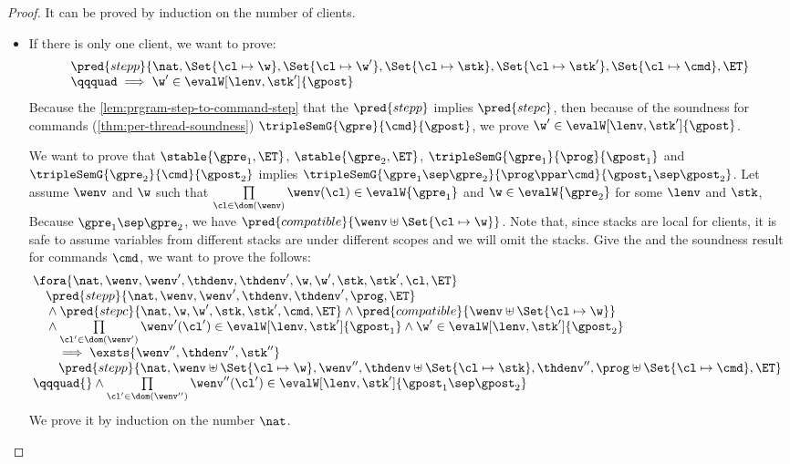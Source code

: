 \begin{proof}
It can be proved by induction on the number of clients.

\begin{itemize}
\item \caseB{\( \prog = \Set{\txid \mapsto \cmd} \)}
If there is only one client, we want to prove:
\[
    \begin{array}{l}
    \pred{stepp}{\nat, \Set{\cl \mapsto \w},\Set{\cl \mapsto \w'}, \Set{\cl \mapsto \stk}, \Set{ \cl \mapsto \stk'}, \Set{\cl \mapsto \cmd}, \ET} \\
    \qqquad \implies \w' \in \evalW[\lenv, \stk']{\gpost}
\end{array}
\]
Because the \cref{lem:prgram-step-to-command-step} that the \( \pred{stepp} \) implies \( \pred{stepc}\), 
then because of the soundness for commands (\cref{thm:per-thread-soundness}) \( \tripleSemG{\gpre}{\cmd}{\gpost}\), we prove \( \w' \in \evalW[\lenv, \stk']{\gpost} \).

\caseI{\( \prog \ppar \cmd \)}
We want to prove that \( \stable{\gpre_1, \ET} \), \( \stable{\gpre_2, \ET} \), \( \tripleSemG{\gpre_{1}}{\prog}{ \gpost_{1} } \) and \( \tripleSemG{\gpre_{2}}{\cmd}{ \gpost_{2} } \) implies \( \tripleSemG{\gpre_{1} \sep \gpre_{2}}{\prog \ppar \cmd}{ \gpost_{1} \sep \gpost_{2} } \).
Let assume \( \wenv \) and \( \w \) such that \( \prod\limits_{\cl \in \dom(\wenv)} \wenv(\cl) \in \evalW{\gpre_{1}} \) and \( \w \in \evalW{\gpre_{2}}\) for some \( \lenv \) and \( \stk \),
Because \( \gpre_{1} \sep \gpre_{2} \), we have \( \pred{compatible}{\wenv \uplus \Set{\cl \mapsto \w}}\).
Note that, since stacks are local for clients, it is safe to assume variables from different stacks are under different scopes and we will omit the stacks.
Give the \ih and the soundness result for commands \( \cmd \), we want to prove the follows:
\[
\begin{array}{@{}l}
    \fora{\nat, \wenv, \wenv', \thdenv, \thdenv', \w, \w', \stk, \stk', \cl, \ET}  \\
    \quad \pred{stepp}{\nat, \wenv, \wenv', \thdenv, \thdenv', \prog, \ET}  \\
    \quad {} \land \pred{stepc}{\nat, \w, \w', \stk, \stk', \cmd, \ET} 
    \land \pred{compatible}{\wenv \uplus \Set{\cl \mapsto \w}} \\
    \quad {} \land \prod\limits_{\cl' \in \dom(\wenv') } \wenv'(\cl')  \in \evalW[\lenv, \stk']{\gpost_{1}} \land \w' \in \evalW[\lenv, \stk']{\gpost_{2}} \\
    \qquad \implies \exsts{\wenv'', \thdenv'', \stk'' }  \\
    \qquad \pred{stepp}{\nat, \wenv \uplus \Set{\cl \mapsto \w}, \wenv'', \thdenv \uplus \Set{\cl \mapsto \stk}, \thdenv'', \prog \uplus \Set{\cl \mapsto \cmd}, \ET}  \\
    \qqquad {} \land \prod\limits_{\cl' \in \dom(\wenv'') } \wenv''(\cl')  \in \evalW[\lenv, \stk']{\gpost_{1} \sep \gpost_{2}}
\end{array}
\]
We prove it by induction on the number \( \nat \).
\begin{itemize}


\end{itemize}
\end{itemize}
\end{proof}
